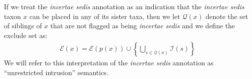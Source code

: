 \documentclass[english]{article}
\begin{document}
If we treat the  \emph{incertae sedis} annotation as an indication that the 
    \emph{incertae sedis} taxon $x$ can be placed in any of its sister taxa, then
    we let $\mathcal{Q}(x)$ denote the set of siblings of $x$ that are not
    flagged as being \emph{incertae sedis} and we define the exclude set as:
\begin{align}
    \mathcal{E}(x) = \mathcal{E}(p(x)) \cup \left\{ \bigcup_{s\in \mathcal{Q}(x)} \mathcal{I}(s)\right\}
    \label{eq:exsetformonea}
\end{align}
We will refer to this interpretation of the \emph{incertae sedis} annotation as ``unrestricted
    intrusion'' semantics.




\end{document}
